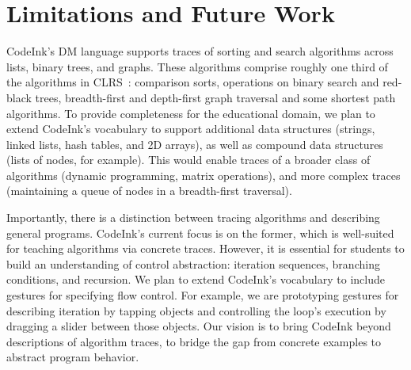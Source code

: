 \section{Limitations and Future Work}
\label{sec:design-and-future-work}
CodeInk's DM language supports traces of sorting and search algorithms across
lists, binary trees, and graphs. These algorithms comprise roughly one third of
the algorithms in CLRS~\cite{Cormen2001}: comparison sorts, operations on binary
search and red-black trees, breadth-first and depth-first graph traversal and
some shortest path algorithms. To provide completeness for the educational
domain, we plan to extend CodeInk's vocabulary to support additional data
structures (strings, linked lists, hash tables, and 2D arrays), as well as
compound data structures (lists of nodes, for example). This would enable traces
of a broader class of algorithms (dynamic programming, matrix operations), and
more complex traces (maintaining a queue of nodes in a breadth-first traversal).

Importantly, there is a distinction between tracing algorithms and describing
general programs. CodeInk's current focus is on the former, which is well-suited
for teaching algorithms via concrete traces. However, it is essential for
students to build an understanding of control abstraction: iteration sequences,
branching conditions, and recursion. We plan to extend CodeInk's vocabulary to
include gestures for specifying flow control. For example, we are prototyping
gestures for describing iteration by tapping objects and controlling the loop's
execution by dragging a slider between those objects. Our vision is to bring
CodeInk beyond descriptions of algorithm traces, to bridge the gap from concrete
examples to abstract program behavior.

